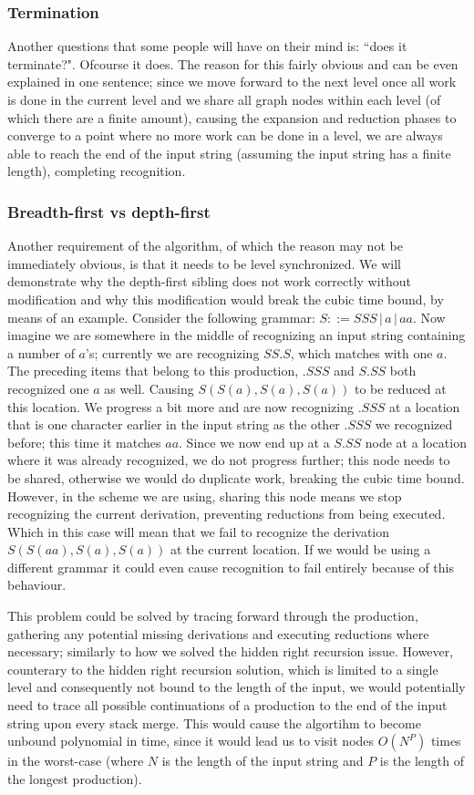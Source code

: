 \documentclass[a4paper,10pt]{article}
\begin{document}
\subsubsection{Termination}
Another questions that some people will have on their mind is: ``does it terminate?". Ofcourse it does. The reason for this fairly obvious and can be even explained in one sentence; since we move forward to the next level once all work is done in the current level and we share all graph nodes within each level (of which there are a finite amount), causing the expansion and reduction phases to converge to a point where no more work can be done in a level, we are always able to reach the end of the input string (assuming the input string has a finite length), completing recognition.

\subsubsection{Breadth-first vs depth-first}
\label{subsec:breadthFirstVsDepthFirst}
Another requirement of the algorithm, of which the reason may not be immediately obvious, is that it needs to be level synchronized. We will demonstrate why the depth-first sibling does not work correctly without modification and why this modification would break the cubic time bound, by means of an example. Consider the following grammar: $S ::= SSS\,|\,a\,|\,aa$. Now imagine we are somewhere in the middle of recognizing an input string containing a number of $a$'s; currently we are recognizing $SS.S$, which matches with one $a$. The preceding items that belong to this production, $.SSS$ and $S.SS$ both recognized one $a$ as well. Causing $S(S(a),S(a),S(a))$ to be reduced at this location. We progress a bit more and are now recognizing $.SSS$ at a location that is one character earlier in the input string as the other $.SSS$ we recognized before; this time it matches $aa$. Since we now end up at a $S.SS$ node at a location where it was already recognized, we do not progress further; this node needs to be shared, otherwise we would do duplicate work, breaking the cubic time bound. However, in the scheme we are using, sharing this node means we stop recognizing the current derivation, preventing reductions from being executed. Which in this case will mean that we fail to recognize the derivation $S(S(aa),S(a),S(a))$ at the current location. If we would be using a different grammar it could even cause recognition to fail entirely because of this behaviour.

This problem could be solved by tracing forward through the production, gathering any potential missing derivations and executing reductions where necessary; similarly to how we solved the hidden right recursion issue. However, counterary to the hidden right recursion solution, which is limited to a single level and consequently not bound to the length of the input, we would potentially need to trace all possible continuations of a production to the end of the input string upon every stack merge. This would cause the algortihm to become unbound polynomial in time, since it would lead us to visit nodes $O(N^P)$ times in the worst-case (where $N$ is the length of the input string and $P$ is the length of the longest production).
\end{document}
